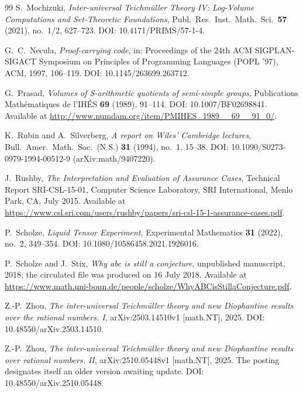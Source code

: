 \documentclass[11pt,a4paper]{article}
\begin{document}
\begin{thebibliography}{99}
S.~Mochizuki,
\emph{Inter-universal Teichmüller Theory IV: Log-Volume
Computations and Set-Theoretic Foundations},
Publ.\ Res.\ Inst.\ Math.\ Sci.\ \textbf{57} (2021), no.~1/2, 627--723.
DOI: 10.4171/PRIMS/57-1-4.

G.~C.~Necula,
\emph{Proof-carrying code},
in: Proceedings of the 24th ACM SIGPLAN-SIGACT Symposium on Principles
of Programming Languages (POPL '97), ACM, 1997, 106--119.
DOI: 10.1145/263699.263712.

G.~Prasad,
\emph{Volumes of S-arithmetic quotients of semi-simple groups},
Publications Math\'{e}matiques de l'IH\'{E}S \textbf{69} (1989),
91--114.
DOI: 10.1007/BF02698841.
Available at \url{http://www.numdam.org/item/PMIHES_1989__69__91_0/}.

K.~Rubin and A.~Silverberg,
\emph{A report on Wiles' Cambridge lectures},
Bull.\ Amer.\ Math.\ Soc.\ (N.S.) \textbf{31} (1994), no.~1, 15--38.
DOI: 10.1090/S0273-0979-1994-00512-9 (arXiv:math/9407220).

J.~Rushby,
\emph{The Interpretation and Evaluation of Assurance Cases},
Technical Report SRI-CSL-15-01, Computer Science Laboratory,
SRI International, Menlo Park, CA, July 2015.
Available at
\url{https://www.csl.sri.com/users/rushby/papers/sri-csl-15-1-assurance-cases.pdf}.

P.~Scholze,
\emph{Liquid Tensor Experiment},
Experimental Mathematics \textbf{31} (2022), no.~2, 349--354.
DOI: 10.1080/10586458.2021.1926016.

P.~Scholze and J.~Stix,
\emph{Why abc is still a conjecture},
unpublished manuscript, 2018; the circulated file was produced on
16 July 2018.
Available at
\url{https://www.math.uni-bonn.de/people/scholze/WhyABCisStillaConjecture.pdf}.

Z.-P.~Zhou,
\emph{The inter-universal Teichmüller theory and new Diophantine
results over the rational numbers. I},
arXiv:2503.14510v1 [math.NT], 2025.
DOI: 10.48550/arXiv.2503.14510.

Z.-P.~Zhou,
\emph{The inter-universal Teichmüller theory and new Diophantine
results over rational numbers. II},
arXiv:2510.05448v1 [math.NT], 2025.
The posting designates itself an older version awaiting update.
DOI: 10.48550/arXiv.2510.05448.

\end{thebibliography}
\end{document}
